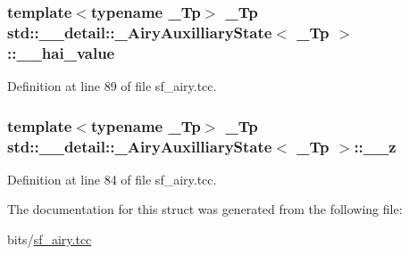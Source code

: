 \subsubsection[{\texorpdfstring{\+\_\+\+\_\+hai\+\_\+value}{__hai_value}}]{\setlength{\rightskip}{0pt plus 5cm}template$<$typename \+\_\+\+Tp$>$ \+\_\+\+Tp {\bf std\+::\+\_\+\+\_\+detail\+::\+\_\+\+Airy\+Auxilliary\+State}$<$ \+\_\+\+Tp $>$\+::\+\_\+\+\_\+hai\+\_\+value}\hypertarget{structstd_1_1____detail_1_1__AiryAuxilliaryState_aaa9bc55d2a2d9be324651966cd008a28}{}\label{structstd_1_1____detail_1_1__AiryAuxilliaryState_aaa9bc55d2a2d9be324651966cd008a28}


Definition at line 89 of file sf\+\_\+airy.\+tcc.

\subsubsection[{\texorpdfstring{\+\_\+\+\_\+z}{__z}}]{\setlength{\rightskip}{0pt plus 5cm}template$<$typename \+\_\+\+Tp$>$ \+\_\+\+Tp {\bf std\+::\+\_\+\+\_\+detail\+::\+\_\+\+Airy\+Auxilliary\+State}$<$ \+\_\+\+Tp $>$\+::\+\_\+\+\_\+z}\hypertarget{structstd_1_1____detail_1_1__AiryAuxilliaryState_a276bc30e3202259480073e2835075399}{}\label{structstd_1_1____detail_1_1__AiryAuxilliaryState_a276bc30e3202259480073e2835075399}


Definition at line 84 of file sf\+\_\+airy.\+tcc.



The documentation for this struct was generated from the following file\+:\begin{DoxyCompactItemize}
\item 
bits/\hyperlink{sf__airy_8tcc}{sf\+\_\+airy.\+tcc}\end{DoxyCompactItemize}

